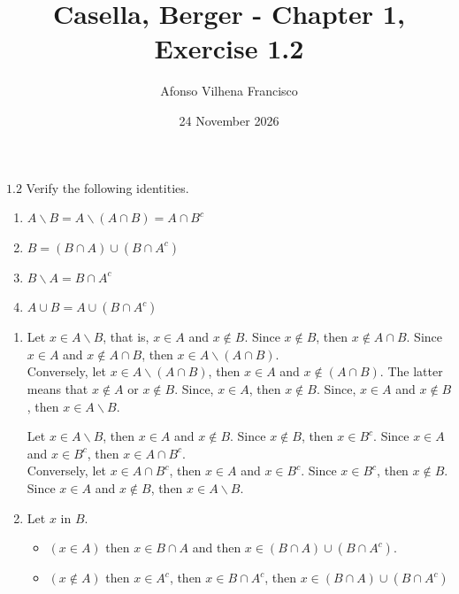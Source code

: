 \documentclass{article}
\title{Casella, Berger - Chapter 1, Exercise 1.2}
\author{Afonso Vilhena Francisco}
\date{24 November 2026}
\begin{document}
\maketitle

$\mathbf{1.2}$ Verify the following identities.
\begin{enumerate}[label=(\alph*)]
    \item $A\backslash B = A \backslash (A \cap B) = A \cap B^c$
    \item $B = (B \cap A) \cup (B \cap A^c)$
    \item $B\backslash A = B \cap A^c$
    \item $A \cup B = A \cup (B \cap A^c)$
\end{enumerate}

\vspace{1cm}
\begin{enumerate}[label=(\alph*)]
    \item Let $x \in A\backslash B$, that is, $x \in A$ and $x \notin B$. Since $x \notin B$, then $x \notin A \cap B$. Since $x \in A$ and $x \notin A \cap B$, then $x \in A \backslash (A \cap B)$.\\
    Conversely, let $x \in A \backslash (A \cap B)$, then $x \in A$ and $x \notin (A \cap B)$. The latter means that $x \notin A$ or $x \notin B$. Since, $x \in A$, then $x \notin B$. Since, $x \in A$ and $x \notin B$, then $x \in A \backslash B$.\\
    
    \par
    
    Let $x \in A \backslash B$, then $x \in A$ and $x \notin B$. Since $x \notin B$, then $x \in B^c$. Since $x \in A$ and $x \in B^c$, then $x \in A \cap B^c$.\\
    Conversely, let $x \in A\cap B^c$, then $x \in A$ and $x \in B^c$. Since $x \in B^c$, then $x \notin B$. Since $x \in A$ and $x \notin B$, then $x \in A \backslash B.$

    \vspace{0.5cm}
    
    \item Let $x$ in $B$. 
    \begin{itemize}
        \item $(x \in A)$ then $x \in B \cap A$ and then $x \in (B \cap A) \cup (B \cap A^c)$.
        \item $(x \notin A)$ then $x \in A^c$, then $x \in B \cap A^c$, then $x \in (B \cap A) \cup (B \cap A^c)$
    \end{itemize}


\end{enumerate}
\end{document}
